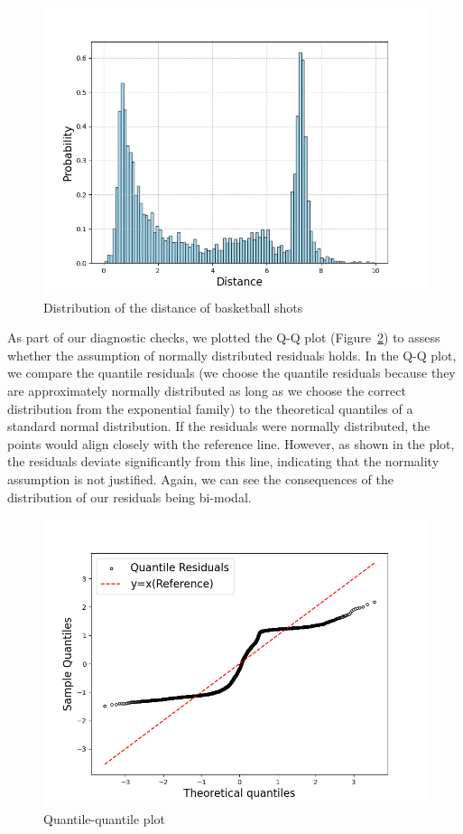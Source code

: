 \documentclass[9pt]{IEEEtran}
\begin{document}
\begin{figure}[h]
    \centering
    \includegraphics[width=0.99\columnwidth]{figures/distr.png}
    \caption{Distribution of the distance of basketball shots}
    \label{fig:distr}
\end{figure}


As part of our diagnostic checks, we plotted the Q-Q plot
 (Figure~\ref{fig:qq}) to assess whether the assumption of normally
  distributed residuals holds. In the Q-Q plot, we compare the quantile
   residuals (we choose the quantile residuals because they are approximately normally distributed as 
   long as we choose the correct distribution from the exponential family)
    to the theoretical quantiles of a standard normal distribution.
    If the residuals were normally distributed, the points would align closely
     with the reference line. However, as shown in the plot, the residuals
      deviate significantly from this line, indicating that the normality 
      assumption is not justified. Again, we can see the consequences of the 
      distribution of our residuals being bi-modal.


\begin{figure}[h]
    \centering
    \includegraphics[width=0.99\columnwidth]{figures/qq.png}
    \caption{Quantile-quantile plot}
    \label{fig:qq}
\end{figure}
\end{document}
